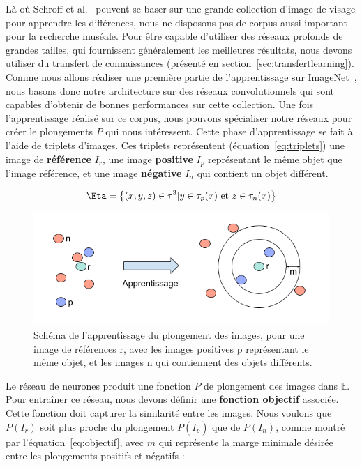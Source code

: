 Là où Schroff et al.~\cite{schroff2015facenet} peuvent se baser sur une grande collection d'image de visage pour apprendre les différences, nous ne disposons pas de corpus aussi important pour la recherche muséale. 
Pour être capable d'utiliser des réseaux profonds de grandes tailles, qui fournissent généralement les meilleures résultats, nous devons utiliser du transfert de connaissances (présenté en section~\ref{sec:transfertlearning}). 
Comme nous allons réaliser une première partie de l'apprentissage sur ImageNet~\cite{deng2009imagenet}, nous basons donc notre architecture sur des réseaux convolutionnels qui sont capables d'obtenir de bonnes performances sur cette collection.
Une fois l'apprentissage réalisé sur ce corpus, nous pouvons spécialiser notre réseaux pour créer le plongements $P$ qui nous intéressent.
Cette phase d'apprentissage se fait à l'aide de triplets d'images.
Ces triplets représentent (équation~\ref{eq:triplets}) une image de \textbf{référence}  $I_r$, une image \textbf{positive}  $I_p$ représentant le même objet que l'image référence, et une image \textbf{négative}  $I_n$ qui contient un objet différent.

\begin{equation}
\Eta = \left\{ (x,y,z) \in \tau^3 | y \in \tau_p(x) \text{ et } z \in \tau_n(x) \right\}
\label{eq:triplets}
\end{equation}

\begin{figure}%
\includegraphics[width=\columnwidth]{figures/Entrainementtriplet.png}%
\caption{Schéma de l'apprentissage du plongement des images, pour une image de références r, avec les images positives p représentant le même objet, et les images n qui contiennent des objets différents.}%
\label{fig:apprentissagetriplet}%
\end{figure}

Le réseau de neurones produit une fonction $P$ de plongement des images dans $\mathbb{E}$. Pour entraîner ce réseau, nous devons définir une \textbf{fonction objectif} associée. 
Cette fonction doit capturer la similarité entre les images.
Nous voulons que $P(I_r)$ soit plus proche du plongement $P(I_p)$ que de $P(I_n)$, comme montré par l'équation~\ref{eq:objectif}, avec $m$ qui représente la marge minimale désirée entre les plongements positifs et négatifs :

